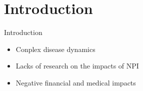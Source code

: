 \section{Introduction}

\begin{frame}{Introduction}
\begin{itemize}
    \item Conplex disease dynamics
    \item Lacks of research on the impacts of \gls{NPI}
    \item Negative financial and medical impacts
\end{itemize}
\end{frame}